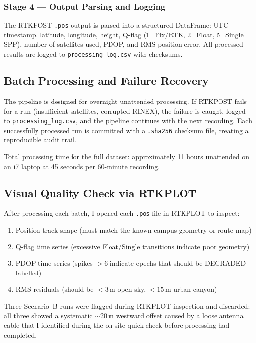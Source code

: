 \documentclass[12pt,a4paper]{article}
\newcommand{\code}[1]{\texttt{#1}}
\begin{document}
\subsubsection{Stage 4 --- Output Parsing and Logging}

The RTKPOST \code{.pos} output is parsed into a structured DataFrame:
UTC timestamp, latitude, longitude, height, Q-flag (1=Fix/RTK, 2=Float, 5=Single SPP),
number of satellites used, PDOP, and RMS position error.
All processed results are logged to \code{processing\_log.csv} with checksums.

\subsection{Batch Processing and Failure Recovery}

The pipeline is designed for overnight unattended processing.
If RTKPOST fails for a run (insufficient satellites, corrupted RINEX), the failure
is caught, logged to \code{processing\_log.csv}, and the pipeline continues with the
next recording.
Each successfully processed run is committed with a \code{.sha256} checksum file,
creating a reproducible audit trail.

Total processing time for the full dataset: approximately 11 hours unattended on an i7
laptop at 45 seconds per 60-minute recording.

\subsection{Visual Quality Check via RTKPLOT}

After processing each batch, I opened each \code{.pos} file in RTKPLOT to inspect:
\begin{enumerate}
  \item Position track shape (must match the known campus geometry or route map)
  \item Q-flag time series (excessive Float/Single transitions indicate poor geometry)
  \item PDOP time series (spikes $> 6$ indicate epochs that should be DEGRADED-labelled)
  \item RMS residuals (should be $< 3$\,m open-sky, $< 15$\,m urban canyon)
\end{enumerate}

Three Scenario~B runs were flagged during RTKPLOT inspection and discarded: all three
showed a systematic $\sim$20\,m westward offset caused by a loose antenna cable that
I identified during the on-site quick-check before processing had completed.
\end{document}
